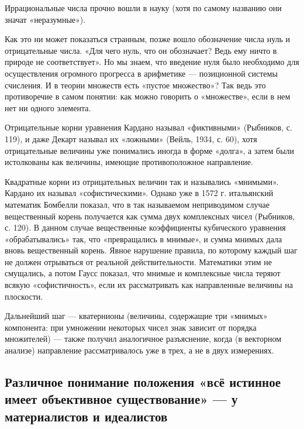 Иррациональные числа прочно вошли в науку (хотя по самому названию они
значат «неразумные»).

Как это  ни может показаться  странным, позже вошло  обозначение числа
нуль и  отрицательные числа. «Для  чего нуль, что он  обозначает? Ведь
ему ничто в природе не соответствует».  Но мы знаем, что введение нуля
было необходимо для осуществления огромного прогресса в арифметике ---
позиционной  системы  счисления.  И  в теории  множеств  есть  «пустое
множество»?  Так ведь  это  противоречие в  самом  понятии: как  можно
говорить о «множестве», если в нем нет ни одного элемента.

Отрицательные корни уравнения  Кардано называл «фиктивными» (Рыбников,
с. 119), и даже Декарт называл их «ложными» (Вейль, 1934, с. 60), хотя
отрицательные величины уже понимались иногда  в форме «долга», а затем
были истолкованы как величины, имеющие противоположное направление.

Квадратные корни из отрицательных  величин так и назывались «мнимыми».
Кардано их называл «софистическими». Однако  уже в 1572 г. итальянский
математик Бомбелли  показал, что в так  называемом неприводимом случае
вещественный  корень  получается  как  сумма  двух  комплексных  чисел
(Рыбников,  с.   120).  В  данном  случае   вещественные  коэффициенты
кубического  уравнения  «обрабатывались»   так,  что  «превращались  в
мнимые»,  и  сумма  мнимых   дала  вновь  вещественный  корень.  Явное
нарушение  правила, по  которому каждый  шаг не  должен отрываться  от
реальной действительности. Математики этим не смущались, а потом Гаусс
показал, что мнимые и комплексные числа теряют всякую «софистичность»,
если их рассматривать как направленные величины на плоскости.

Дальнейший  шаг ---  кватернионы  (величины,  содержащие три  «мнимых»
компонента:  при умножении  некоторых  чисел знак  зависит от  порядка
множителей)  ---  также  получил  аналогичное  разъяснение,  когда  (в
векторном анализе) направление рассматривалось уже в трех, а не в двух
измерениях.

\subsection{Различное   понимание   положения  «всё   истинное   имеет
объективное существование» --- у материалистов и идеалистов}

